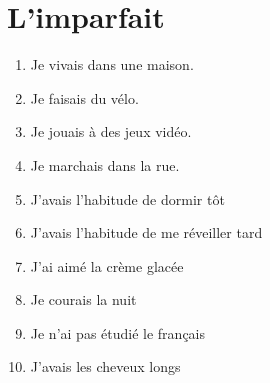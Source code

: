 \section*{L'imparfait}

\begin{enumerate}
    \item Je vivais dans une maison.              %
    \item Je faisais du vélo.                     %
    \item Je jouais à des jeux vidéo.             %
    \item Je marchais dans la rue.                %
    \item J'avais l'habitude de dormir tôt        %
    \item J'avais l'habitude de me réveiller tard %
    \item J'ai aimé la crème glacée               %
    \item Je courais la nuit                      %
    \item Je n'ai pas étudié le français          %
    \item J'avais les cheveux longs               %
\end{enumerate}